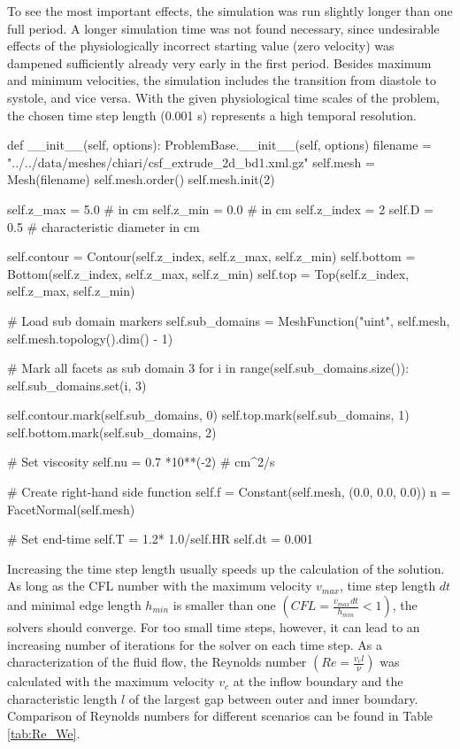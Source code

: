 To see the most important effects, the simulation was run slightly longer than one full period. A longer simulation time was not found necessary, since undesirable effects of the physiologically incorrect starting value (zero velocity) was dampened sufficiently already very early in the first period. Besides maximum and minimum velocities, the simulation includes the transition from diastole to systole, and vice versa.  With the given physiological time scales of the problem, the chosen time step length (0.001 s) represents a high temporal resolution.
\begin{python}
def __init__(self, options):
	ProblemBase.__init__(self, options)
	filename = "../../data/meshes/chiari/csf_extrude_2d_bd1.xml.gz"
	self.mesh = Mesh(filename)
	self.mesh.order()
	self.mesh.init(2)

	self.z_max = 5.0	# in cm
	self.z_min = 0.0	# in cm
	self.z_index = 2
	self.D = 0.5 		# characteristic diameter in cm

	self.contour = Contour(self.z_index, self.z_max, self.z_min)
	self.bottom = Bottom(self.z_index, self.z_max, self.z_min)
	self.top = Top(self.z_index, self.z_max, self.z_min)

    # Load sub domain markers
	self.sub_domains =  MeshFunction("uint", self.mesh, self.mesh.topology().dim() - 1)

	# Mark all facets as sub domain 3
	for i in range(self.sub_domains.size()):
		self.sub_domains.set(i, 3)

	self.contour.mark(self.sub_domains, 0)
	self.top.mark(self.sub_domains, 1)
	self.bottom.mark(self.sub_domains, 2)

    # Set viscosity
	self.nu = 0.7 *10**(-2) # cm^2/s

    # Create right-hand side function
	self.f = Constant(self.mesh, (0.0, 0.0, 0.0))
	n = FacetNormal(self.mesh)

    # Set end-time
	self.T = 1.2* 1.0/self.HR
	self.dt = 0.001
\end{python}

Increasing the time step length usually speeds up the calculation of
the solution. As long as the CFL number with the maximum velocity
$v_{max}$, time step length $dt$ and minimal edge length $h_{min}$ is
smaller than one $(CFL = \frac{v_{max} dt}{h_{min}} < 1)$, the solvers
should converge. For too small time steps, however, it can lead to
an increasing number of iterations for the solver on each time step.
As a characterization of the fluid flow, the Reynolds number $(Re =
\frac{v_c l}{\nu})$ was calculated with the maximum velocity $v_c$ at
the inflow boundary and the characteristic length $l$ of the largest
gap between outer and inner boundary. Comparison of Reynolds numbers
for different scenarios can be found in Table \ref{tab:Re_We}.

